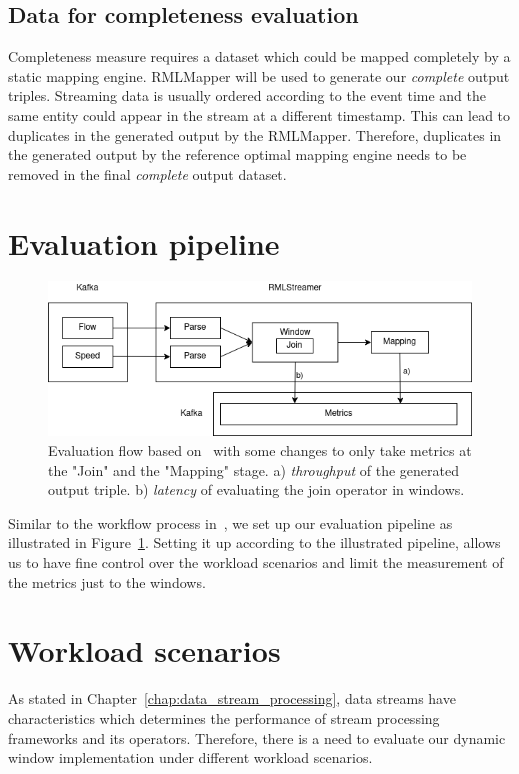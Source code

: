 \subsection{Data for completeness evaluation}
Completeness measure requires a dataset which could be mapped completely by a static 
mapping engine. RMLMapper  will
be used to generate our \emph{complete} output triples. Streaming data is usually 
ordered according to the event time and the same entity could appear in the 
stream at a different timestamp. This can lead to duplicates in the generated output by 
the RMLMapper. Therefore, duplicates in the generated output by the reference optimal
mapping engine needs to be removed in the final \emph{complete} output dataset.

\section{Evaluation pipeline}

\begin{figure}[!htbp]
    \centering
    \includegraphics[width=\textwidth]{fig/evaluation_architecture.png}
    \caption{Evaluation flow based on~\cite{evalution_of_spe} with some changes to only 
    take metrics at the "Join" and the "Mapping" stage. a) \emph{throughput} of the generated output triple. 
    b) \emph{latency} of evaluating the join operator in windows.}
    \label{fig:evaluation_flow}
    
\end{figure}

Similar to the workflow process in~\cite{evalution_of_spe, benchmark_dsp}, we set up
our evaluation pipeline as illustrated in Figure~\ref{fig:evaluation_flow}. Setting it 
up according to the illustrated pipeline, allows us to have fine control over the 
workload scenarios and limit the measurement of the metrics just to the windows. 



\section{Workload scenarios}
As stated in Chapter~\ref{chap:data_stream_processing}, data streams have characteristics 
which determines the performance of stream processing frameworks and its operators. Therefore, 
there is a need to evaluate our dynamic window implementation under different workload scenarios. 

